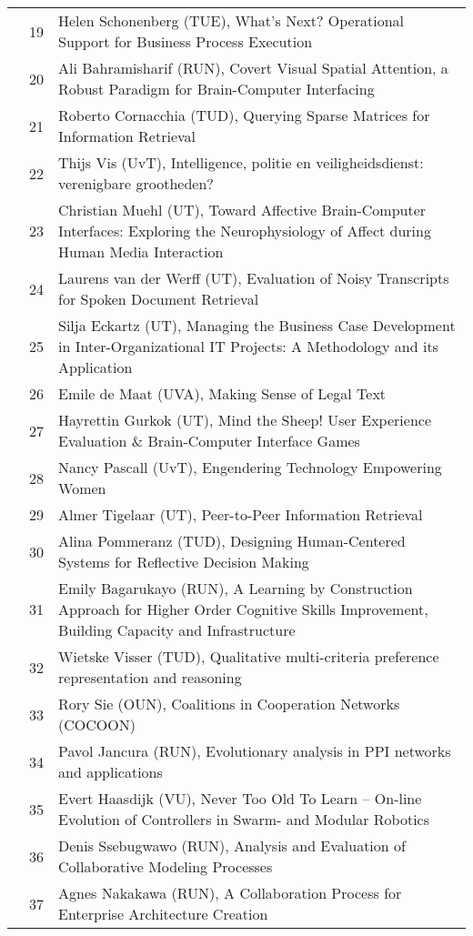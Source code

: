 \begin{longtabu}{@{}l@{ }l@{\hspace{1em}}X}
	&	 19	&	 Helen Schonenberg (TUE), What's Next? Operational Support for Business Process Execution\\
	&	 20	&	 Ali Bahramisharif (RUN), Covert Visual Spatial Attention, a Robust Paradigm for Brain-Computer Interfacing\\
	&	 21	&	 Roberto Cornacchia (TUD), Querying Sparse Matrices for Information Retrieval\\
	&	 22	&	 Thijs Vis (UvT), Intelligence, politie en veiligheidsdienst: verenigbare grootheden?\\
	&	 23	&	 Christian Muehl (UT), Toward Affective Brain-Computer Interfaces: Exploring the Neurophysiology of Affect during Human Media Interaction\\
	&	 24	&	 Laurens van der Werff (UT), Evaluation of Noisy Transcripts for Spoken Document Retrieval\\
	&	 25	&	 Silja Eckartz (UT), Managing the Business Case Development in Inter-Organizational IT Projects: A Methodology and its Application\\
	&	 26	&	 Emile de Maat (UVA), Making Sense of Legal Text\\
	&	 27	&	 Hayrettin Gurkok (UT), Mind the Sheep! User Experience Evaluation \& Brain-Computer Interface Games\\
	&	 28	&	 Nancy Pascall (UvT), Engendering Technology Empowering Women\\
	&	 29	&	 Almer Tigelaar (UT), Peer-to-Peer Information Retrieval\\
	&	 30	&	 Alina Pommeranz (TUD), Designing Human-Centered Systems for Reflective Decision Making\\
	&	 31	&	 Emily Bagarukayo (RUN), A Learning by Construction Approach for Higher Order Cognitive Skills Improvement, Building Capacity and Infrastructure\\
	&	 32	&	 Wietske Visser (TUD), 	Qualitative multi-criteria preference representation and reasoning\\
	&	 33	&	 Rory Sie (OUN), Coalitions in Cooperation Networks (COCOON)\\
	&	 34	&	 Pavol Jancura (RUN), Evolutionary analysis in PPI networks and applications\\
	&	 35	&	 Evert Haasdijk (VU), Never Too Old To Learn -- On-line Evolution of Controllers in Swarm- and Modular Robotics\\
	&	 36	&	 Denis Ssebugwawo (RUN), Analysis and Evaluation of Collaborative Modeling Processes\\
	&	 37	&	 Agnes Nakakawa (RUN), A Collaboration Process for Enterprise Architecture Creation\\

\end{longtabu}
